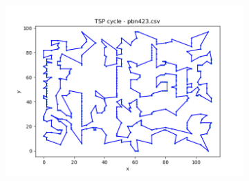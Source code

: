 \documentclass[12pt]{article}
\begin{document}
\begin{figure}[htpb]
\begin{subfigure}[b]{0.475\textwidth}
                \includegraphics[width=\linewidth]{img/pbn423.png}
            \end{subfigure}
        \end{figure}
\end{document}
